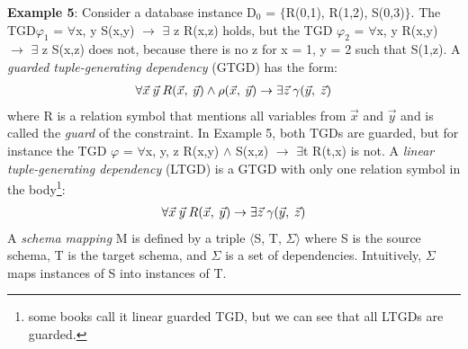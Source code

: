 \documentclass[11pt, a4paper, dvipsnames]{article}
\begin{document}
\textbf{Example 5}: Consider a database instance D$_{0}$ = $\{$R(0,1), R(1,2), S(0,3)$\}$. The TGD\newline $\varphi_{1}$ = $\forall$x, y S(x,y) $\rightarrow$ $\exists$ z R(x,z) holds, but the TGD $\varphi_{2}$ = $\forall$x, y R(x,y) $\rightarrow$ $\exists$ z S(x,z) does not, because there is no z for x = 1, y = 2 such that S(1,z).\newline
A \textit{guarded tuple-generating dependency} (GTGD) has the form:
\begin{gather*}
\forall \vec{x} \hspace{0.25em}\vec{y} \hspace{0.25em}R(\vec{x}, \hspace{0.25em} \vec{y}) \wedge \rho(\vec{x}, \hspace{0.25em}\vec{y}) \rightarrow \exists \vec{z} \hspace{0.25em}\gamma(\vec{y}, \hspace{0.25em}\vec{z})
\end{gather*}
where R is a relation symbol that mentions all variables from $\vec{x}$ and $\vec{y}$ and is called the \textit{guard} of the constraint. In Example 5, both TGDs are guarded, but for instance the TGD $\varphi$ = $\forall$x, y, z R(x,y) $\wedge$ S(x,z) $\rightarrow$ $\exists$t R(t,x) is not.\newline
A \textit{linear tuple-generating dependency} (LTGD) is a GTGD with only one relation symbol in the body\footnote{some books call it linear guarded TGD, but we can see that all LTGDs are guarded.}:
\begin{gather*}
\forall \vec{x} \hspace{0.25em}\vec{y} \hspace{0.25em}R(\vec{x}, \hspace{0.25em} \vec{y}) \rightarrow \exists \vec{z} \hspace{0.25em}\gamma(\vec{y}, \hspace{0.25em}\vec{z})
\end{gather*}
A \textit{schema mapping} M is defined by a triple $\langle$S, T, $\Sigma\rangle$ where S is the source schema, T is the target schema, and $\Sigma$ is a set of dependencies. Intuitively, $\Sigma$ maps instances of S into instances of T.
\end{document}
